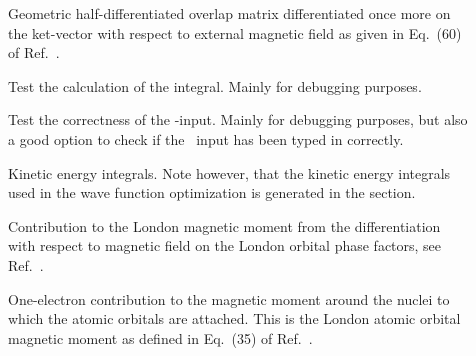 \begin{description}
\item[] Geometric half-differentiated overlap
matrix
differentiated once more on the ket-vector with respect to external
magnetic field as given in Eq.~(60) of Ref.~\cite{klbpjthkrhjajjcp98}.

\item[] Test the calculation of the 
integral. Mainly for debugging purposes.

\item[] Test the correctness of the -input. Mainly
for debugging purposes, but also a good option to check if the \mol\ input
has been typed in correctly.

\item[] Kinetic energy integrals. Note however, that the kinetic energy integrals used in the
wave function optimization is generated in the  section.


\item[] Contribution to the London magnetic
moment from
the differentiation with respect to magnetic field on the London
orbital phase factors, see Ref.~\cite{thpjjcp95}.


\item[] One-electron contribution to the magnetic
moment
around the nuclei to which the
atomic orbitals are attached. This is the London atomic
orbital
magnetic moment as defined in Eq.~(35) of
Ref.~\cite{krthklbpjhjajjcp99}.



\end{description}

